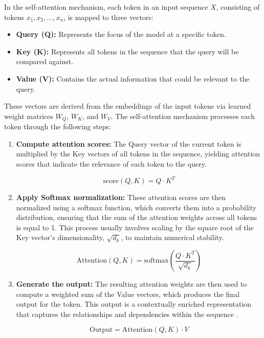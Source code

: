 In the self-attention mechanism, each token in an input sequence \( X \), consisting of tokens \( x_1, x_2, \ldots, x_n \), is mapped to three vectors:

\begin{itemize}
    \item \textbf{Query (Q):} Represents the focus of the model at a specific token.
    \item \textbf{Key (K):} Represents all tokens in the sequence that the query will be compared against.
    \item \textbf{Value (V):} Contains the actual information that could be relevant to the query.
\end{itemize}

These vectors are derived from the embeddings of the input tokens via learned weight matrices \( W_Q \), \( W_K \), and \( W_V \). The self-attention mechanism processes each token through the following steps:

\begin{enumerate}
    \item \textbf{Compute attention scores:} The Query vector of the current token is multiplied by the Key vectors of all tokens in the sequence, yielding attention scores that indicate the relevance of each token to the query.

    \begin{equation}
        \text{score}(Q, K) = Q \cdot K^T
    \end{equation}
    
    \item \textbf{Apply Softmax normalization:} These attention scores are then normalized using a softmax function, which converts them into a probability distribution, ensuring that the sum of the attention weights across all tokens is equal to 1. This process usually involves scaling by the square root of the Key vector's dimensionality, \( \sqrt{d_k} \), to maintain numerical stability.

    \begin{equation}
        \text{Attention}(Q, K) = \text{softmax}\left(\frac{Q \cdot K^T}{\sqrt{d_k}} \right)
    \end{equation}
    
    \item \textbf{Generate the output:} The resulting attention weights are then used to compute a weighted sum of the Value vectors, which produces the final output for the token. This output is a contextually enriched representation that captures the relationships and dependencies within the sequence \cite{vaswani2017attention}.

    \begin{equation}
        \text{Output} = \text{Attention}(Q, K) \cdot V
    \end{equation}
\end{enumerate}

